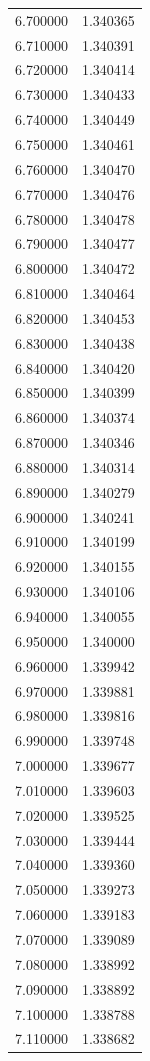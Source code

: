 \begin{tabular}{rr}
6.700000 & 1.340365 \\
6.710000 & 1.340391 \\
6.720000 & 1.340414 \\
6.730000 & 1.340433 \\
6.740000 & 1.340449 \\
6.750000 & 1.340461 \\
6.760000 & 1.340470 \\
6.770000 & 1.340476 \\
6.780000 & 1.340478 \\
6.790000 & 1.340477 \\
6.800000 & 1.340472 \\
6.810000 & 1.340464 \\
6.820000 & 1.340453 \\
6.830000 & 1.340438 \\
6.840000 & 1.340420 \\
6.850000 & 1.340399 \\
6.860000 & 1.340374 \\
6.870000 & 1.340346 \\
6.880000 & 1.340314 \\
6.890000 & 1.340279 \\
6.900000 & 1.340241 \\
6.910000 & 1.340199 \\
6.920000 & 1.340155 \\
6.930000 & 1.340106 \\
6.940000 & 1.340055 \\
6.950000 & 1.340000 \\
6.960000 & 1.339942 \\
6.970000 & 1.339881 \\
6.980000 & 1.339816 \\
6.990000 & 1.339748 \\
7.000000 & 1.339677 \\
7.010000 & 1.339603 \\
7.020000 & 1.339525 \\
7.030000 & 1.339444 \\
7.040000 & 1.339360 \\
7.050000 & 1.339273 \\
7.060000 & 1.339183 \\
7.070000 & 1.339089 \\
7.080000 & 1.338992 \\
7.090000 & 1.338892 \\
7.100000 & 1.338788 \\
7.110000 & 1.338682 \\

\end{tabular}
